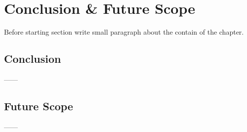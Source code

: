 \chapter{Conclusion \& Future Scope}
Before starting section write small paragraph about the contain of the chapter.

\section{Conclusion}
------
\section{Future Scope}
------